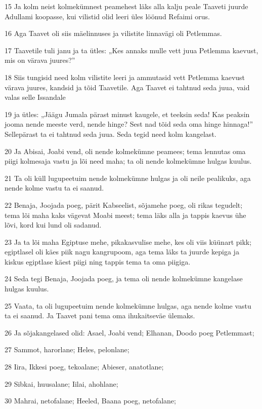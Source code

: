 \par 15 Ja kolm neist kolmekümnest peamehest läks alla kalju peale Taaveti juurde Adullami koopasse, kui vilistid olid leeri üles löönud Refaimi orus.
\par 16 Aga Taavet oli siis mäelinnuses ja vilistite linnavägi oli Petlemmas.
\par 17 Taavetile tuli janu ja ta ütles: „Kes annaks mulle vett juua Petlemma kaevust, mis on värava juures?”
\par 18 Siis tungisid need kolm vilistite leeri ja ammutasid vett Petlemma kaevust värava juures, kandsid ja tõid Taavetile. Aga Taavet ei tahtnud seda juua, vaid valas selle Issandale
\par 19 ja ütles: „Jäägu Jumala pärast minust kaugele, et teeksin seda! Kas peaksin jooma nende meeste verd, nende hinge? Sest nad tõid seda oma hinge hinnaga!” Sellepärast ta ei tahtnud seda juua. Seda tegid need kolm kangelast.
\par 20 Ja Abisai, Joabi vend, oli nende kolmekümne peamees; tema lennutas oma piigi kolmesaja vastu ja lõi need maha; ta oli nende kolmekümne hulgas kuulus.
\par 21 Ta oli küll lugupeetuim nende kolmekümne hulgas ja oli neile pealikuks, aga nende kolme vastu ta ei saanud.
\par 22 Benaja, Joojada poeg, pärit Kabseelist, sõjamehe poeg, oli rikas tegudelt; tema lõi maha kaks vägevat Moabi meest; tema läks alla ja tappis kaevus ühe lõvi, kord kui lund oli sadanud.
\par 23 Ja ta lõi maha Egiptuse mehe, pikakasvulise mehe, kes oli viis küünart pikk; egiptlasel oli käes piik nagu kangrupoom, aga tema läks ta juurde kepiga ja kiskus egiptlase käest piigi ning tappis tema ta oma piigiga.
\par 24 Seda tegi Benaja, Joojada poeg, ja tema oli nende kolmekümne kangelase hulgas kuulus.
\par 25 Vaata, ta oli lugupeetuim nende kolmekümne hulgas, aga nende kolme vastu ta ei saanud. Ja Taavet pani tema oma ihukaitseväe ülemaks.
\par 26 Ja sõjakangelased olid: Asael, Joabi vend; Elhanan, Doodo poeg Petlemmast;
\par 27 Sammot, harorlane; Heles, pelonlane;
\par 28 Iira, Ikkesi poeg, tekoalane; Abieser, anatotlane;
\par 29 Sibkai, huusalane; Iilai, ahohlane;
\par 30 Mahrai, netofalane; Heeled, Baana poeg, netofalane;
